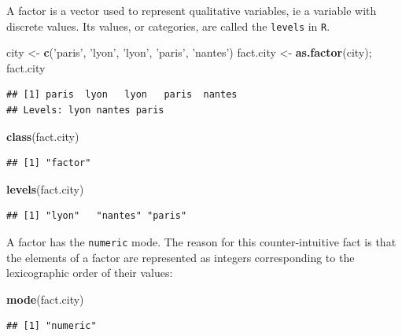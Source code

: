 \documentclass[]{book}
\newenvironment{Shaded}{\begin{snugshade}}{\end{snugshade}}
\newcommand{\KeywordTok}[1]{\textcolor[rgb]{0.13,0.29,0.53}{\textbf{#1}}}
\newcommand{\NormalTok}[1]{#1}
\newcommand{\StringTok}[1]{\textcolor[rgb]{0.31,0.60,0.02}{#1}}
\begin{document}
A factor is a vector used to represent qualitative variables, ie a variable with discrete values. Its values, or categories, are called the \texttt{levels} in \texttt{R}.

\begin{Shaded}
\begin{Highlighting}[]
\NormalTok{city <-}\StringTok{ }\KeywordTok{c}\NormalTok{(}\StringTok{'paris'}\NormalTok{, }\StringTok{'lyon'}\NormalTok{, }\StringTok{'lyon'}\NormalTok{, }\StringTok{'paris'}\NormalTok{, }\StringTok{'nantes'}\NormalTok{)}
\NormalTok{fact.city <-}\StringTok{ }\KeywordTok{as.factor}\NormalTok{(city); fact.city}
\end{Highlighting}
\end{Shaded}

\begin{verbatim}
## [1] paris  lyon   lyon   paris  nantes
## Levels: lyon nantes paris
\end{verbatim}

\begin{Shaded}
\begin{Highlighting}[]
\KeywordTok{class}\NormalTok{(fact.city)}
\end{Highlighting}
\end{Shaded}

\begin{verbatim}
## [1] "factor"
\end{verbatim}

\begin{Shaded}
\begin{Highlighting}[]
\KeywordTok{levels}\NormalTok{(fact.city)}
\end{Highlighting}
\end{Shaded}

\begin{verbatim}
## [1] "lyon"   "nantes" "paris"
\end{verbatim}

A factor has the \texttt{numeric} mode. The reason for this counter-intuitive fact is that the elements of a factor are represented as integers corresponding to the lexicographic order of their values:

\begin{Shaded}
\begin{Highlighting}[]
\KeywordTok{mode}\NormalTok{(fact.city)}
\end{Highlighting}
\end{Shaded}

\begin{verbatim}
## [1] "numeric"
\end{verbatim}
\end{document}
